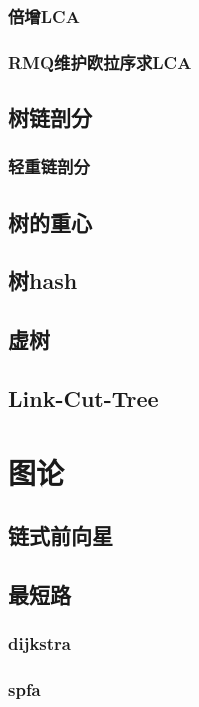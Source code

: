 ﻿\documentclass[a4paper,twocolumn]{article}
\begin{document}
\subsubsection{倍增LCA}

\subsubsection{RMQ维护欧拉序求LCA}

\subsection{树链剖分}
\subsubsection{轻重链剖分}

\subsection{树的重心}

\subsection{树hash}

\subsection{虚树}

\subsection{Link-Cut-Tree}

\section{图论}
\subsection{链式前向星}

\subsection{最短路}
\subsubsection{dijkstra}

\subsubsection{spfa}

\end{document}
